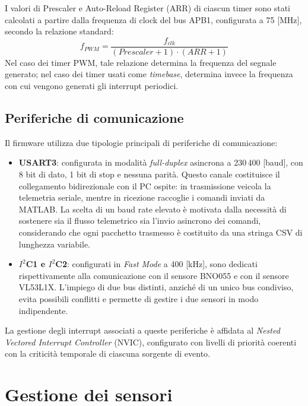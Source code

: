 \documentclass[11pt]{report}
\begin{document}
I valori di Prescaler e Auto-Reload Register (ARR) di ciascun timer sono stati calcolati a partire dalla frequenza di clock del bus APB1, configurata a 75 [MHz], secondo la relazione standard:
\begin{equation}
    f_{PWM} = \frac{f_{clk}}{(Prescaler + 1) \cdot (ARR + 1)}
    \label{eq:timer_freq}
\end{equation}
Nel caso dei timer PWM, tale relazione determina la frequenza del segnale generato; nel caso dei timer usati come \textit{timebase}, determina invece la frequenza con cui vengono generati gli interrupt periodici.

\subsection{Periferiche di comunicazione}
Il firmware utilizza due tipologie principali di periferiche di comunicazione:
\begin{itemize}
    \item \textbf{USART3}: configurata in modalità \textit{full-duplex} asincrona a 230\,400 [baud], con 8 bit di dato, 1 bit di stop e nessuna parità. Questo canale costituisce il collegamento bidirezionale con il PC ospite: in trasmissione veicola la telemetria seriale, mentre in ricezione raccoglie i comandi inviati da MATLAB. La scelta di un baud rate elevato è motivata dalla necessità di sostenere sia il flusso telemetrico sia l'invio asincrono dei comandi, considerando che ogni pacchetto trasmesso è costituito da una stringa CSV di lunghezza variabile.

    \item \textbf{$I^{2}$C1 e $I^{2}$C2}: configurati in \textit{Fast Mode} a 400 [kHz], sono dedicati rispettivamente alla comunicazione con il sensore BNO055 e con il sensore VL53L1X. L'impiego di due bus distinti, anziché di un unico bus condiviso, evita possibili conflitti e permette di gestire i due sensori in modo indipendente.
\end{itemize}

La gestione degli interrupt associati a queste periferiche è affidata al \textit{Nested Vectored Interrupt Controller} (NVIC), configurato con livelli di priorità coerenti con la criticità temporale di ciascuna sorgente di evento.

\section{Gestione dei sensori}
\end{document}
